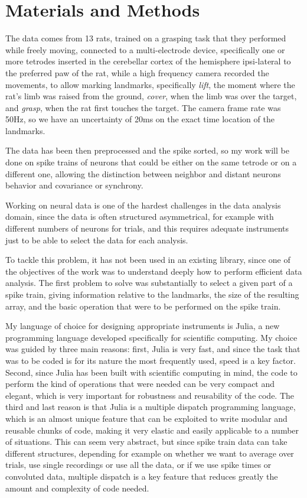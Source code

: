 \section{Materials and Methods}

The data comes from 13 rats, trained on a grasping task that they performed while freely moving, connected to a multi-electrode device, specifically one or more tetrodes inserted in the cerebellar cortex of the hemisphere ipsi-lateral to the preferred paw of the rat, while a high frequency camera recorded the movements, to allow marking landmarks, specifically \emph{lift}, the moment where the rat's limb was raised from the ground, \emph{cover}, when the limb was over the target, and \emph{grasp}, when the rat first touches the target. The camera frame rate was 50Hz, so we have an uncertainty of 20ms on the exact time location of the landmarks.

The data has been then preprocessed and the spike sorted, so my work will be done on spike trains of neurons that could be either on the same tetrode or on a different one, allowing the distinction between neighbor and distant neurons behavior and covariance or synchrony.


Working on neural data is one of the hardest challenges in the data analysis domain, since the data is often structured asymmetrical, for example with different numbers of neurons for trials, and this requires adequate instruments just to be able to select the data for each analysis.

To tackle this problem, it has not been used in an existing library, since one of the objectives of the work was to understand deeply how to perform efficient data analysis. 
The first problem to solve was substantially to select a given part of a spike train, giving information relative to the landmarks, the size of the resulting array, and the basic operation that were to be performed on the spike train.

My language of choice for designing appropriate instruments is Julia, a new programming language developed specifically for scientific computing. My choice was guided by three main reasons: first, Julia is very fast, and since the task that was to be coded is for its nature the most frequently used, speed is a key factor. Second, since Julia has been built with scientific computing in mind, the code to perform the kind of operations that were needed can be very compact and elegant, which is very important for robustness and reusability of the code. The third and last reason is that Julia is a multiple dispatch programming language, which is an almost unique feature that can be exploited to write modular and reusable chunks of code, making it very elastic and easily applicable to a number of situations. This can seem very abstract, but since spike train data can take different structures, depending for example on whether we want to average over trials, use single recordings or use all the data, or if we use spike times or convoluted data, multiple dispatch is a key feature that reduces greatly the amount and complexity of code needed.

